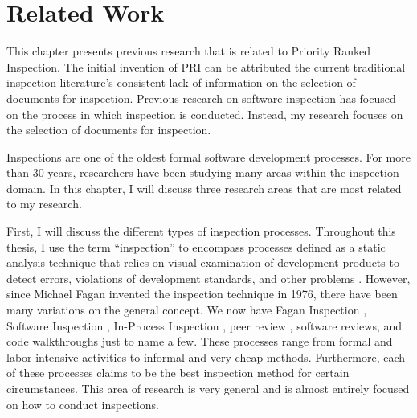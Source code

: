 

\chapter{Related Work}
\label{chapter:relatedwork}
This chapter presents previous research that is related to Priority Ranked
Inspection.  The initial invention of PRI can be attributed the current
traditional inspection literature's consistent lack of information on the
selection of documents for inspection. Previous research on software
inspection has focused on the process in which inspection is conducted.
Instead, my research focuses on the selection of documents for inspection.

Inspections are one of the oldest formal software development processes.
For more than 30 years, researchers have been studying many areas within
the inspection domain. In this chapter, I will discuss three research areas
that are most related to my research.

First, I will discuss the different types of inspection processes.
Throughout this thesis, I use the term ``inspection'' to encompass
processes defined as a static analysis technique that relies on visual
examination of development products to detect errors, violations of
development standards, and other problems \cite{IEEE-STD88}. However, since
Michael Fagan invented the inspection technique in 1976, there have been
many variations on the general concept. We now have Fagan Inspection
\cite{Fagan76}, Software Inspection \cite{Gilb93}, In-Process Inspection
\cite{Strauss94}, peer review \cite{Wiegers01}, software reviews, and code
walkthroughs just to name a few. These processes range from formal and
labor-intensive activities to informal and very cheap methods. Furthermore,
each of these processes claims to be the best inspection method for certain
circumstances. This area of research is very general and is almost entirely
focused on how to conduct inspections.

